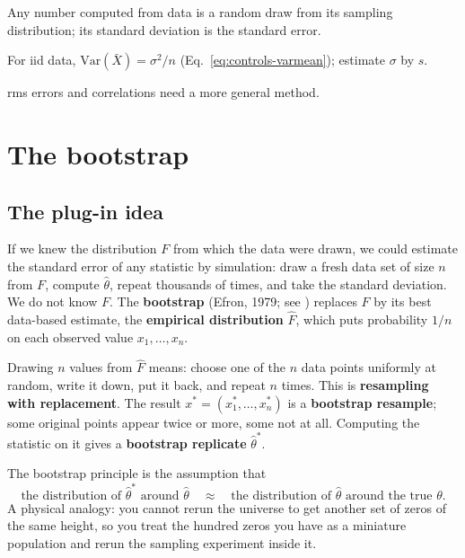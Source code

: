 \begin{keyideas}
\item Any number computed from data is a random draw from its sampling distribution; its standard deviation is the standard error.
\item For iid data, $\mathrm{Var}(\bar X)=\sigma^2/n$ (Eq.~\eqref{eq:controls-varmean}); estimate $\sigma$ by $s$.
\item rms errors and correlations need a more general method.
\end{keyideas}

\section{The bootstrap}\label{sec:controls-bootstrap}

\subsection{The plug-in idea}

If we knew the distribution $F$ from which the data were drawn, we could estimate the standard error of any statistic by simulation: draw a fresh data set of size $n$ from $F$, compute $\hat\theta$, repeat thousands of times, and take the standard deviation. We do not know $F$. The \textbf{bootstrap} (Efron, 1979; see \cite{efron}) replaces $F$ by its best data-based estimate, the \textbf{empirical distribution} $\hat F$, which puts probability $1/n$ on each observed value $x_1,\dots,x_n$.

Drawing $n$ values from $\hat F$ means: choose one of the $n$ data points uniformly at random, write it down, put it back, and repeat $n$ times. This is \textbf{resampling with replacement}. The result $x^*=(x^*_1,\dots,x^*_n)$ is a \textbf{bootstrap resample}; some original points appear twice or more, some not at all. Computing the statistic on it gives a \textbf{bootstrap replicate} $\hat\theta^*$.

The bootstrap principle is the assumption that
\begin{equation}
\text{the distribution of }\hat\theta^*\text{ around }\hat\theta\quad\approx\quad\text{the distribution of }\hat\theta\text{ around the true }\theta.
\label{eq:controls-principle}
\end{equation}
A physical analogy: you cannot rerun the universe to get another set of zeros of the same height, so you treat the hundred zeros you have as a miniature population and rerun the sampling experiment inside it.

